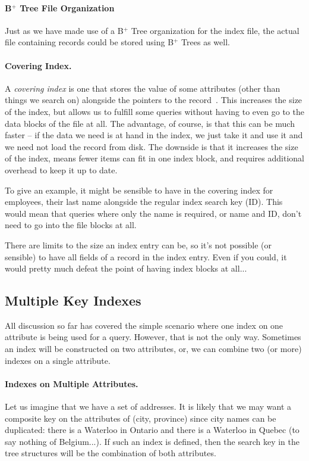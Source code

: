 \documentclass[a4paper]{report}
\begin{document}
\paragraph{B$^{+}$ Tree File Organization} 
Just as we have made use of a B$^{+}$ Tree organization for the index file, the actual file containing records could be stored using B$^{+}$ Trees as well.

\paragraph{Covering Index.} 
A \textit{covering index} is one that stores the value of some attributes (other than things we search on) alongside the pointers to the record~\cite{dsc}. This increases the size of the index, but allows us to fulfill some queries without having to even go to the data blocks of the file at all. The advantage, of course, is that this can be much faster -- if the data we need is at hand in the index, we just take it and use it and we need not load the record from disk. The downside is that it increases the size of the index, means fewer items can fit in one index block, and requires additional overhead to keep it up to date.

To give an example, it might be sensible to have in the covering index for employees, their last name alongside the regular index search key (ID). This would mean that queries where only the name is required, or name and ID, don't need to go into the file blocks at all.

There are limits to the size an index entry can be, so it's not possible (or sensible) to have all fields of a record in the index entry. Even if you could, it would pretty much defeat the point of having index blocks at all...

\subsection*{Multiple Key Indexes}

All discussion so far has covered the simple scenario where one index on one attribute is being used for a query. However, that is not the only way. Sometimes an index will be constructed on two attributes, or, we can combine two (or more) indexes on a single attribute. 

\paragraph{Indexes on Multiple Attributes.} Let us imagine that we have a set of addresses. It is likely that we may want a composite key on the attributes of (city, province) since city names can be duplicated: there is a Waterloo in Ontario and there is a Waterloo in Quebec (to say nothing of Belgium...). If such an index is defined, then the search key in the tree structures will be the combination of both attributes. 
\end{document}
